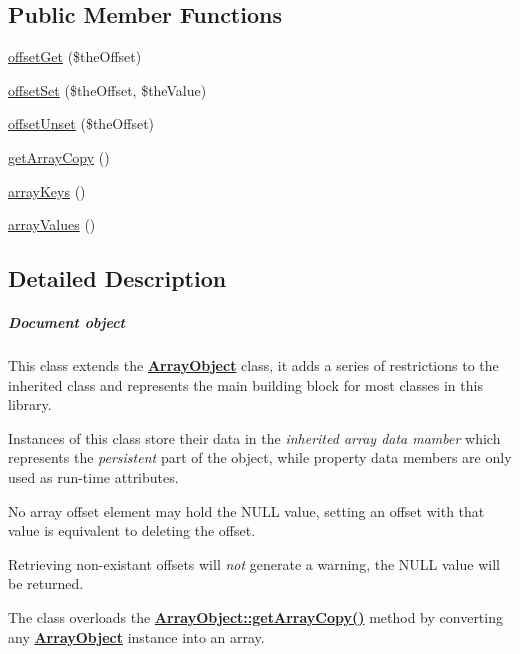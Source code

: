 \subsection*{Public Member Functions}
\begin{DoxyCompactItemize}
\item 
\hyperlink{class_ontology_wrapper_1_1_document_object_a034f55170eb880dd210f0c9ab15233bc}{offset\-Get} (\$the\-Offset)
\item 
\hyperlink{class_ontology_wrapper_1_1_document_object_aa2e3a251dd102f8aba0645b405a16053}{offset\-Set} (\$the\-Offset, \$the\-Value)
\item 
\hyperlink{class_ontology_wrapper_1_1_document_object_a834adbf7c1f027c3f817dbcf4f12de2d}{offset\-Unset} (\$the\-Offset)
\item 
\hyperlink{class_ontology_wrapper_1_1_document_object_a1d497371592ce2600533565cfaae91b8}{get\-Array\-Copy} ()
\item 
\hyperlink{class_ontology_wrapper_1_1_document_object_a4a96a40abe667d9c3ac7a5d5675dece5}{array\-Keys} ()
\item 
\hyperlink{class_ontology_wrapper_1_1_document_object_ab8e04acc8c14acbeae6d530a604b676a}{array\-Values} ()
\end{DoxyCompactItemize}


\subsection{Detailed Description}
\subparagraph*{Document object}

This class extends the {\bfseries {\ttfamily \hyperlink{}{Array\-Object}}} class, it adds a series of restrictions to the inherited class and represents the main building block for most classes in this library.

Instances of this class store their data in the {\itshape inherited array data mamber} which represents the {\itshape persistent} part of the object, while property data members are only used as run-\/time attributes.

No array offset element may hold the {\ttfamily N\-U\-L\-L} value, setting an offset with that value is equivalent to deleting the offset.

Retrieving non-\/existant offsets will {\itshape not} generate a warning, the {\ttfamily N\-U\-L\-L} value will be returned.

The class overloads the {\bfseries {\ttfamily \hyperlink{}{Array\-Object\-::get\-Array\-Copy()}}} method by converting any {\bfseries {\ttfamily \hyperlink{}{Array\-Object}}} instance into an array.

